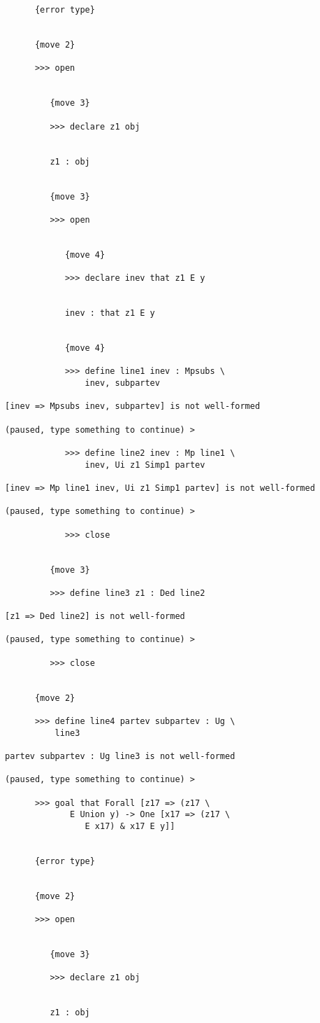\documentclass[12pt]{article}
\begin{document}
\begin{verbatim}
      {error type}


      {move 2}

      >>> open


         {move 3}

         >>> declare z1 obj


         z1 : obj


         {move 3}

         >>> open


            {move 4}

            >>> declare inev that z1 E y


            inev : that z1 E y


            {move 4}

            >>> define line1 inev : Mpsubs \
                inev, subpartev

[inev => Mpsubs inev, subpartev] is not well-formed

(paused, type something to continue) >

            >>> define line2 inev : Mp line1 \
                inev, Ui z1 Simp1 partev

[inev => Mp line1 inev, Ui z1 Simp1 partev] is not well-formed

(paused, type something to continue) >

            >>> close


         {move 3}

         >>> define line3 z1 : Ded line2

[z1 => Ded line2] is not well-formed

(paused, type something to continue) >

         >>> close


      {move 2}

      >>> define line4 partev subpartev : Ug \
          line3

partev subpartev : Ug line3 is not well-formed

(paused, type something to continue) >

      >>> goal that Forall [z17 => (z17 \
             E Union y) -> One [x17 => (z17 \
                E x17) & x17 E y]]


      {error type}


      {move 2}

      >>> open


         {move 3}

         >>> declare z1 obj


         z1 : obj



\end{verbatim}
\end{document}
